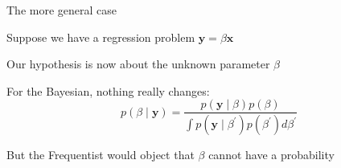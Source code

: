 \documentclass[12pt,aspectratio=169]{beamer}
\begin{document}
\begin{frame}{The more general case}

    Suppose we have a regression problem $\mathbf{y} = \beta\mathbf{x}$
    \pause\newline

    Our hypothesis is now about the unknown parameter $\beta$
    \pause\newline

    For the Bayesian, nothing really changes:
    $$
    p(\beta \mid \mathbf{y}) = \frac{p(\mathbf{y}\mid \beta)p(\beta)}{\int p(\mathbf{y}\mid\beta^\prime)p(\beta^\prime)d\beta^\prime}
    $$
    \pause

    But the Frequentist would object that $\beta$ cannot have a probability
\end{frame}

    

    






\end{document}
